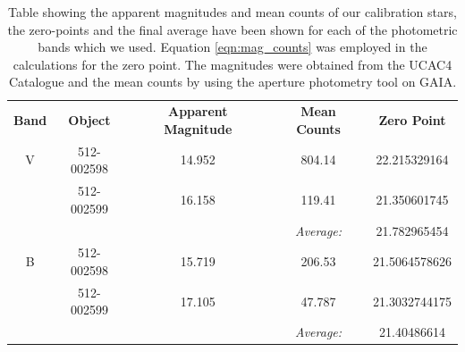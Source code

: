 \documentclass[twocolumn]{revtex4}
\begin{document}
{\vspace{2ex}
\begin{table}[h!]
\centering    
\begin{tabular}{c@{\hskip 5pt} c @{\hskip 15pt}c@{\hskip 15pt} c@{\hskip 15pt} c@{\hskip 15pt}}
    \hline
    \textbf{Band} & \textbf{Object} & \textbf{Apparent Magnitude} & \textbf{Mean Counts} & \textbf{Zero Point\footnotemark}  \\ 
    V & 512-002598 & 14.952 & 804.14 & 22.215329164   \\
     & 512-002599 & 16.158 & 119.41 & 21.350601745 \\
     & & & \textit{Average:} & 21.782965454   \\
    B & 512-002598 & 15.719 & 206.53 & 21.5064578626   \\
     & 512-002599 & 17.105 & 47.787 & 21.3032744175 \\
     & & & \textit{Average:} & 21.40486614 \\
       
    \hline      
\end{tabular}
\caption{Table showing the apparent magnitudes and mean counts of our calibration stars, the zero-points and the final average have been shown for each of the photometric bands which we used. Equation \ref{eqn:mag_counts} was employed in the calculations for the zero point. The magnitudes were obtained from the UCAC4 Catalogue and the mean counts by using the aperture photometry tool on GAIA.} 
\label{table:zero_point}
\end{table}

\vspace{-3ex}
}
\end{document}

